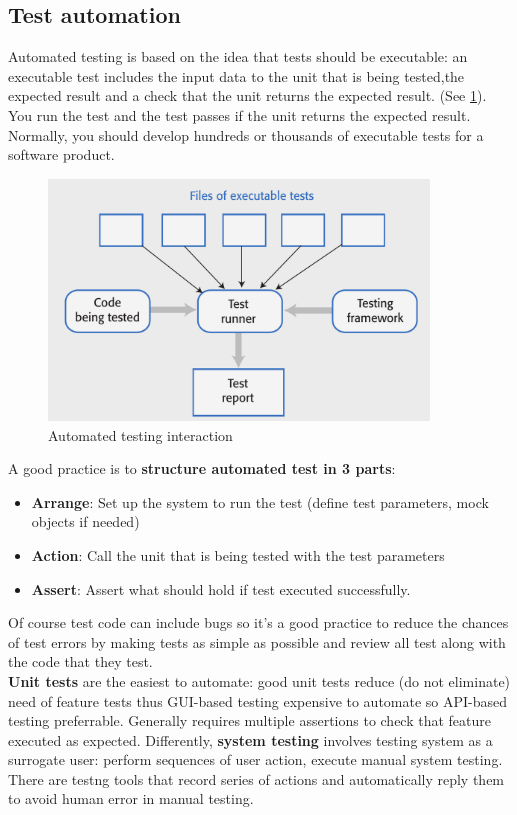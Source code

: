 \documentclass[10pt,a4paper]{report}
\begin{document}
\subsection{Test automation}
Automated testing is based on the idea that tests should be executable: an executable test includes the input data to the unit that is being tested,the expected result and a check that the unit returns the expected result. (See \ref{image107}). 
You run the test and the test passes if the unit returns the expected
result. Normally, you should develop hundreds or thousands of executable tests for a software product.
\begin{figure}[h]
	\centering
	\includegraphics[width=0.9\textwidth]{image107}
	\caption{Automated testing interaction}
	\label{image107}
\end{figure} 
A good practice is to \textbf{structure automated test in 3 parts}:
\begin{itemize}
	\item \textbf{Arrange}: Set up the system to run the test (define test parameters, mock objects if needed)
	\item \textbf{Action}: Call the unit that is being tested with the test parameters
	\item \textbf{Assert}: Assert what should hold if test executed successfully.
\end{itemize}
Of course test code can include bugs so it's a good practice to reduce the chances of test errors by making tests as simple as possible and review all test along with the code that they test. \\
\textbf{Unit tests} are the easiest to automate: good unit tests reduce (do not eliminate) need of feature tests thus GUI-based testing expensive to automate so API-based testing preferrable. Generally requires multiple assertions to check that feature executed as expected. 
Differently, \textbf{system testing} involves testing system as a surrogate user: perform sequences of user action, execute manual system testing. There are testng tools that record series of actions and automatically reply them to avoid human error in manual testing. 
\end{document}
